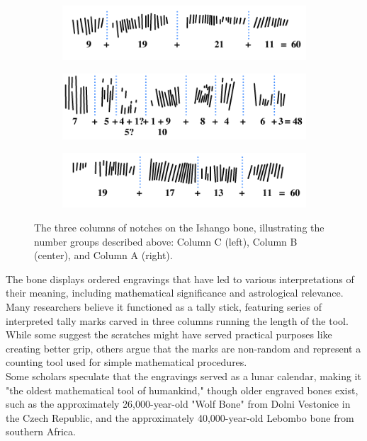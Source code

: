 \documentclass[12pt, oneside, openany]{book}
\begin{document}
\begin{figure}[H]
	\centering
	\begin{subfigure}[b]{0.3\textwidth}
		\centering
		\includegraphics[width=\textwidth]{../images/part-1/IshangoColumnC.png}
	\end{subfigure}
	\hfill
	\begin{subfigure}[b]{0.3\textwidth}
		\centering
		\includegraphics[width=\textwidth]{../images/part-1/IshangoColumnB.png}
	\end{subfigure}
	\hfill
	\begin{subfigure}[b]{0.3\textwidth}
		\centering
		\includegraphics[width=\textwidth]{../images/part-1/IshangoColumnA.png}
	\end{subfigure}
	\caption{The three columns of notches on the Ishango bone, illustrating the number groups described above: Column C (left), Column B (center), and Column A (right).}
	\label{fig:ishango-columns}
\end{figure}
\newpage
The bone displays ordered engravings that have led to various interpretations of their meaning, including mathematical significance and astrological relevance. Many researchers believe it functioned as a tally stick, featuring series of interpreted tally marks carved in three columns running the length of the tool. While some suggest the scratches might have served practical purposes like creating better grip, others argue that the marks are non-random and represent a counting tool used for simple mathematical procedures.\\
Some scholars speculate that the engravings served as a lunar calendar, making it "the oldest mathematical tool of humankind," though older engraved bones exist, such as the approximately 26,000-year-old "Wolf Bone" from Dolni Vestonice in the Czech Republic, and the approximately 40,000-year-old Lebombo bone from southern Africa.
\end{document}
